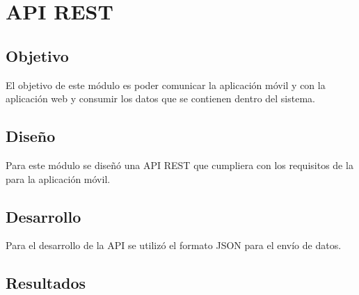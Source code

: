 \section{API REST}

\subsection{Objetivo}
El objetivo de este módulo es poder comunicar la aplicación móvil y con la aplicación web y consumir los datos que se contienen dentro del sistema.

\subsection{Diseño}

Para este módulo se diseñó una API REST que cumpliera con los requisitos de la para la aplicación móvil.

\subsection{Desarrollo}

Para el desarrollo de la API se utilizó el formato JSON para el envío de datos.


\subsection{Resultados}


